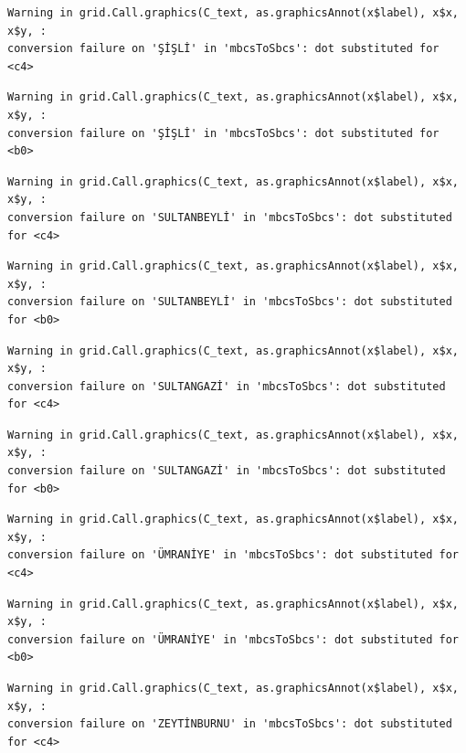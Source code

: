 \documentclass[
  11pt,
  a4paper,
  DIV=11,
  numbers=noendperiod]{scrartcl}
\begin{document}
\begin{verbatim}
Warning in grid.Call.graphics(C_text, as.graphicsAnnot(x$label), x$x, x$y, :
conversion failure on 'ŞİŞLİ' in 'mbcsToSbcs': dot substituted for <c4>
\end{verbatim}

\begin{verbatim}
Warning in grid.Call.graphics(C_text, as.graphicsAnnot(x$label), x$x, x$y, :
conversion failure on 'ŞİŞLİ' in 'mbcsToSbcs': dot substituted for <b0>
\end{verbatim}

\begin{verbatim}
Warning in grid.Call.graphics(C_text, as.graphicsAnnot(x$label), x$x, x$y, :
conversion failure on 'SULTANBEYLİ' in 'mbcsToSbcs': dot substituted for <c4>
\end{verbatim}

\begin{verbatim}
Warning in grid.Call.graphics(C_text, as.graphicsAnnot(x$label), x$x, x$y, :
conversion failure on 'SULTANBEYLİ' in 'mbcsToSbcs': dot substituted for <b0>
\end{verbatim}

\begin{verbatim}
Warning in grid.Call.graphics(C_text, as.graphicsAnnot(x$label), x$x, x$y, :
conversion failure on 'SULTANGAZİ' in 'mbcsToSbcs': dot substituted for <c4>
\end{verbatim}

\begin{verbatim}
Warning in grid.Call.graphics(C_text, as.graphicsAnnot(x$label), x$x, x$y, :
conversion failure on 'SULTANGAZİ' in 'mbcsToSbcs': dot substituted for <b0>
\end{verbatim}

\begin{verbatim}
Warning in grid.Call.graphics(C_text, as.graphicsAnnot(x$label), x$x, x$y, :
conversion failure on 'ÜMRANİYE' in 'mbcsToSbcs': dot substituted for <c4>
\end{verbatim}

\begin{verbatim}
Warning in grid.Call.graphics(C_text, as.graphicsAnnot(x$label), x$x, x$y, :
conversion failure on 'ÜMRANİYE' in 'mbcsToSbcs': dot substituted for <b0>
\end{verbatim}

\begin{verbatim}
Warning in grid.Call.graphics(C_text, as.graphicsAnnot(x$label), x$x, x$y, :
conversion failure on 'ZEYTİNBURNU' in 'mbcsToSbcs': dot substituted for <c4>
\end{verbatim}
\end{document}
